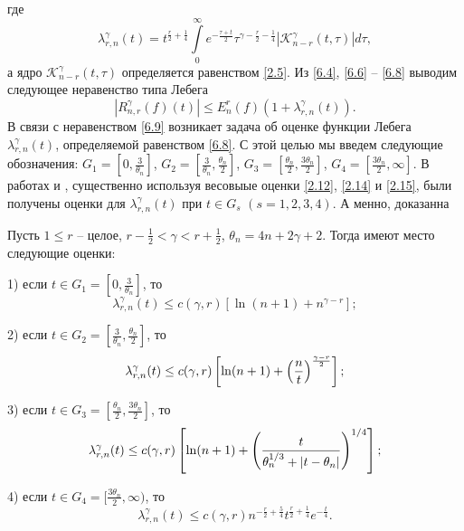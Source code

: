 где
\begin{equation}\label{6.8}
  \lambda_{r,n}^\gamma(t)=t^{\frac r2+\frac14}\int\limits_0^\infty e^{-\frac{\tau+t}2}\tau^{\gamma-\frac r2-\frac14}|\mathcal{K}_{n-r}^\gamma(t,\tau)|d\tau,
\end{equation}
а ядро $\mathcal{K}_{n-r}^\gamma(t,\tau)$ определяется равенством \eqref{2.5}.
Из \eqref{6.4}, \eqref{6.6} -- \eqref{6.8} выводим следующее неравенство типа Лебега
\begin{equation}\label{6.9}
  |R_{n,r}^\gamma(f)(t)|\le E_n^r(f)(1+\lambda_{r,n}^\gamma(t)).
\end{equation}
В связи с неравенством \eqref{6.9} возникает задача об оценке функции Лебега $\lambda_{r,n}^\gamma(t)$, определяемой равенством \eqref{6.8}. С этой целью мы введем следующие обозначения: $G_1=[0,\frac3{\theta_n}]$, $G_2=[\frac3{\theta_n},\frac{\theta_n}2]$, $G_3=[\frac{\theta_n}2,\frac{3\theta_n}2]$, $G_4=[\frac{3\theta_n}2,\infty]$. В работах \cite{Shar11} и \cite{Shar12}, существенно используя весовыые оценки \eqref{2.12}, \eqref{2.14} и \eqref{2.15},  были получены оценки для $\lambda_{r,n}^\gamma(t)$ при $t\in G_s$ $(s=1,2,3,4)$. А менно, доказанна

\begin{theorem}
 Пусть $1\le r$ -- целое, $r-\frac12<\gamma< r+\frac12$, $\theta_n=4n+2\gamma+2$. Тогда имеют место следующие оценки:

1) если $t \in G_1=[0,\frac3{\theta_n}]$,  то
\begin{equation}\label{6.10}
\lambda^\gamma_{r,n}(t) \leq c(\gamma,r)[\ln(n+1)+n^{\gamma-r}];
\end{equation}

2) если $t \in G_2=[\frac3{\theta_n},\frac{\theta_n}2]$, то
\begin{equation}
\lambda_{r,n}^\gamma(t) \leq c(\gamma,r)\left[\ln(n+1)+\left({n\over t}\right)^{\gamma-r\over2}\right];
\label{6.11}
\end{equation}

3) если $t \in G_3=[\frac{\theta_n}2,\frac{3\theta_n}2]$, то
\begin{equation}
\lambda_{r,n}^\gamma(t) \leq c(\gamma,r)\left[\ln(n+1)+\left({t\over \theta_n^{1/3}+|t-\theta_n| }\right)^{1/4}\right];
\label{6.12}
\end{equation}

4) если $t \in G_4=[\frac{3\theta_n}2,\infty)$, то
\begin{equation}
\lambda_{r,n}^\gamma(t) \leq c(\gamma,r)n^{-\frac{r}{2}+\frac54}t^{\frac r2+\frac14}e^{-\frac{t}{4}}.
\label{6.13}
\end{equation}

\end{theorem}







